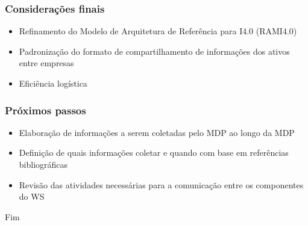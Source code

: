 \documentclass[10pt]{beamer}
\begin{document}
\begin{frame}
	\frametitle{Considerações finais}
	
	\begin{itemize}
		\item Refinamento do Modelo de Arquitetura de Referência para I4.0 (RAMI4.0)
		\item Padronização do formato de compartilhamento de informações dos ativos entre empresas
		\item Eficiência logística
	\end{itemize}
	
\end{frame}
\begin{frame}
	\frametitle{Próximos passos}
	
	\begin{itemize}
		\item Elaboração de informações a serem coletadas pelo MDP ao longo da MDP
		\item Definição de quais informações coletar e quando com base em referências bibliográficas
		\item Revisão das atividades necessárias para a comunicação entre os componentes do WS
	\end{itemize}
	
\end{frame}

\begin{frame}
\Huge{\centerline{Fim}}
\end{frame}
\end{document}
